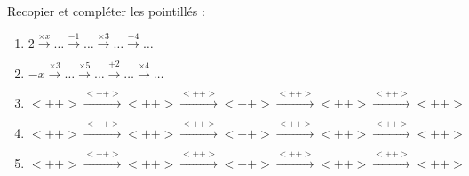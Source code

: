 
\begin{exercice}\label{exosmath-0982}

    Recopier et compléter les pointillés :
    \begin{enumerate}
        \item
        $2\stackrel{\times x}{\longrightarrow}\ldots\stackrel{-1}{\longrightarrow}\ldots\stackrel{\times 3}{\longrightarrow}\ldots\stackrel{-4}{\longrightarrow}\ldots$
    \item
        \( -x\stackrel{\times 3}{\longrightarrow}\ldots\stackrel{\times 5}{\longrightarrow}\ldots\stackrel{+2}{\longrightarrow}  \ldots\stackrel{\times 4}{\longrightarrow}\ldots\)
    \item
        \( <++>\stackrel{ <++> }{\longrightarrow}<++>\stackrel{<++>}{\longrightarrow}<++>\stackrel{<++>}{\longrightarrow}  <++>\stackrel{<++>}{\longrightarrow}<++>\)
    \item
        \( <++>\stackrel{ <++> }{\longrightarrow}<++>\stackrel{<++>}{\longrightarrow}<++>\stackrel{<++>}{\longrightarrow}  <++>\stackrel{<++>}{\longrightarrow}<++>\)
    \item
        \( <++>\stackrel{ <++> }{\longrightarrow}<++>\stackrel{<++>}{\longrightarrow}<++>\stackrel{<++>}{\longrightarrow}  <++>\stackrel{<++>}{\longrightarrow}<++>\)

    \end{enumerate}
\end{exercice}
